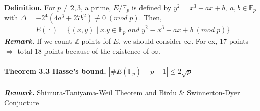 \documentclass[a4paper,10pt]{article}
\begin{document}
\textbf{Definition.} For $p\neq 2,3$, a prime, $E/\mathbb{F}_{p}$ is defined by $y^{2}=x^{3}+ax+b, \; a,b\in\mathbb{F}_{p}$ with
$\Delta=-2^{4}(4a^{3}+27b^{2})\not\equiv0 \; (mod \;p)$. Then,
\begin{align}
E(\mathbb{F})=\{(x,y) \; | \; x.y\in\mathbb{F}_{p} \; and \; y^{2}\equiv x^{3}+ax+b \; (mod \;p)\}
\end{align}
\textit{\textbf{Remark.}} If we count $\mathbb{Z}$ points fof $E$, we should consider $\infty$. For ex, 17 points $\Rightarrow$ total 18 points because of the existence of $\infty$. \\ \\
\textbf{Theorem 3.3 Hasse's bound.} $|\#E(\mathbb{F}_{p})-p-1|\leq2\sqrt{p}$ \\ \\
\textit{\textbf{Remark.}} Shimura-Taniyama-Weil Theorem and Birdu \& Swinnerton-Dyer Conjucture \\ \\
\end{document}
